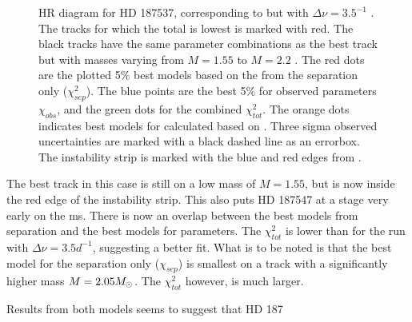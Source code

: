 \begin{figure}[htbp]
	\centering
	\caption{HR diagram for HD 187537, corresponding to  but with $\Delta \nu = 3.5^{-1}$ . The tracks for which the total \chis is lowest is marked with red. The black tracks have the same parameter combinations as the best track but with masses varying from $M=1.55$ to $M=2.2$ \msun. The red dots are the plotted 5\% best models based on the \chis from the separation only ($\chi_{sep}^2$). The blue points are the best 5\% for observed parameters $\chi_{obs}$, and the green dots for the combined $\chi_{tot}^2$. The orange dots indicates best models for \chis calculated based on \lum. Three sigma observed uncertainties are marked with a black dashed line as an errorbox. The instability strip is marked with the blue and red edges from \citet{murphy2019gaia}.}
	\label{finalsuper7}
\end{figure}


The best track in this case is still on a low mass of $M=1.55$\msun, but is now inside the red edge of the instability strip. This also puts HD 187547 at a stage very early on the ms. There is now an overlap between the best models from separation and the best models for parameters. The $\chi_{ tot}^2$ is lower than for the run with $\Delta \nu = 3.5d^{-1}$, suggesting a better fit. What is to be noted is that the best model for the separation only ($\chi_{sep}$) is smallest on a track with a significantly higher mass $M=2.05M_{\odot}$.  The $\chi_{tot}^2$ however, is much larger. 

Results from both models seems to suggest that HD 187

